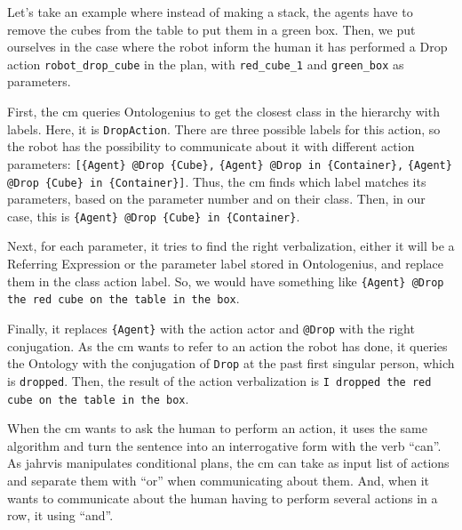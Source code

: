 \documentclass[a4paper,11pt,twoside]{StyleThese}
\begin{document}
Let's take an example where instead of making a stack, the agents have to remove the cubes from the table to put them in a green box. Then, we put ourselves in the case where the robot inform the human it has performed a Drop action \verb'robot_drop_cube' in the plan, with \verb'red_cube_1' and \verb'green_box' as parameters. 

First, the \acrshort{cm} queries Ontologenius to get the closest class in the hierarchy with labels. Here, it is \verb'DropAction'. There are three possible labels for this action, so the robot has the possibility to communicate about it with different action parameters: \verb'[{Agent} @Drop {Cube},' \verb'{Agent} @Drop in {Container},' \verb'{Agent} @Drop {Cube} in {Container}]'. Thus, the \acrshort{cm} finds which label matches its parameters, based on the parameter number and on their class. Then, in our case, this is \verb'{Agent} @Drop {Cube} in {Container}'. 

Next, for each parameter, it tries to find the right verbalization, either it will be a Referring Expression or the parameter label stored in Ontologenius, and replace them in the class action label. So, we would have something like \verb'{Agent} @Drop the red cube on the table in the box'. 

Finally, it replaces \verb'{Agent}' with the action actor and \verb'@Drop' with the right conjugation. As the \acrshort{cm} wants to refer to an action the robot has done, it queries the Ontology with the conjugation of \verb'Drop' at the past first singular person, which is \verb'dropped'. Then, the result of the action verbalization is \verb'I dropped the red cube on the table in the box'. 

When the \acrshort{cm} wants to ask the human to perform an action, it uses the same algorithm and turn the sentence into an interrogative form with the verb ``can''. As \acrshort{jahrvis} manipulates conditional plans, the \acrshort{cm} can take as input list of actions and separate them with ``or'' when communicating about them. And, when it wants to communicate about the human having to perform several actions in a row, it using ``and''.
 
\end{document}
